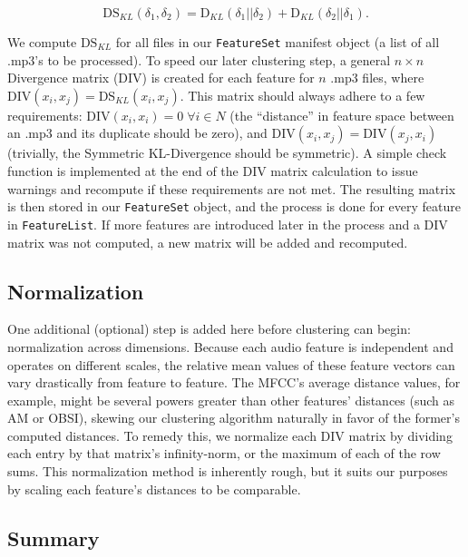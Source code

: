 \documentclass[12pt,twocolumn,titlepage]{article}
\begin{document}
\begin{equation}\label{}
\mathrm{DS}_{KL}(\delta_1, \delta_2) = \mathrm{D}_{KL}(\delta_1 || \delta_2) + \mathrm{D}_{KL}(\delta_2 || \delta_1).
\end{equation}


We compute $\mathrm{DS}_{KL}$ for all files in our \texttt{FeatureSet} manifest object (a list of all .mp3's to be processed). To speed our later clustering step, a general $n \times n$ Divergence matrix (DIV) is created for each feature for $n$ .mp3 files, where $\mathrm{DIV}(x_i, x_j) = \mathrm{DS}_{KL}(x_i, x_j)$. This matrix should always adhere to a few requirements: $\mathrm{DIV}(x_i, x_i) = 0 \; \forall i \in N$ (the ``distance'' in feature space between an .mp3 and its duplicate should be zero), and $\mathrm{DIV}(x_i, x_j) = \mathrm{DIV}(x_j, x_i)$ (trivially, the Symmetric KL-Divergence should be symmetric). A simple check function is implemented at the end of the DIV matrix calculation to issue warnings and recompute if these requirements are not met. The resulting matrix is then stored in our \texttt{FeatureSet} object, and the process is done for every feature in \texttt{FeatureList}. If more features are introduced later in the process and a DIV matrix was not computed, a new matrix will be added and recomputed. 

\subsection{Normalization}

One additional (optional) step is added here before clustering can begin: normalization across dimensions. Because each audio feature is independent and operates on different scales, the relative mean values of these feature vectors can vary drastically from feature to feature. The MFCC's average distance values, for example, might be several powers greater than other features' distances (such as AM or OBSI), skewing our clustering algorithm naturally in favor of the former's computed distances. To remedy this, we normalize each DIV matrix by dividing each entry by that matrix's infinity-norm, or the maximum of each of the row sums. \cite{Rudin} This normalization method is inherently rough, but it suits our purposes by scaling each feature's distances to be comparable.

\subsection{Summary}
\end{document}
